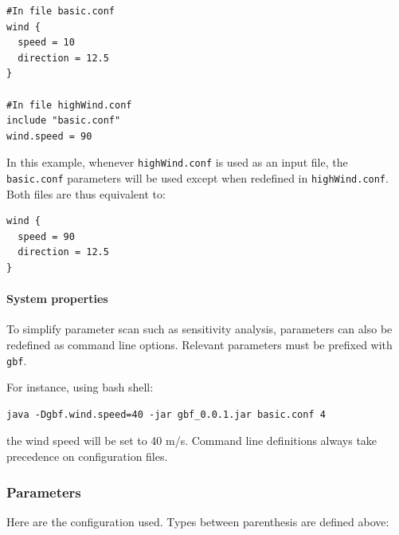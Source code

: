 \documentclass[10pt,a4paper]{article}
\begin{document}
\begin{verbatim}
#In file basic.conf
wind {
  speed = 10
  direction = 12.5
}

#In file highWind.conf
include "basic.conf"
wind.speed = 90
\end{verbatim}

In this example, whenever \texttt{highWind.conf} is used as an input file,
the \texttt{basic.conf} parameters will be used except when redefined in \texttt{highWind.conf}.
Both files are thus equivalent to:

\begin{verbatim}
wind {
  speed = 90
  direction = 12.5
}
\end{verbatim}

\paragraph{System properties}
\label{sec-4-1-4}

To simplify parameter scan such as sensitivity analysis, parameters
can also be redefined as command line options. Relevant parameters
must be prefixed with \texttt{gbf}.

For instance, using bash shell:

\begin{verbatim}
java -Dgbf.wind.speed=40 -jar gbf_0.0.1.jar basic.conf 4
\end{verbatim}

the wind speed will be set to 40 m/s. Command line definitions always
take precedence on configuration files.

\subsubsection{Parameters}
\label{sec-4-2}

Here are the configuration used. Types between parenthesis are defined
above:
\end{document}
